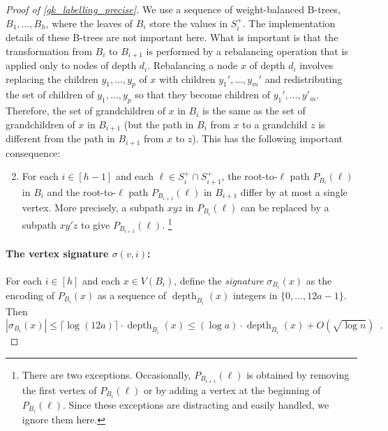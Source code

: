 \documentclass{patmorin}
\renewcommand{\le}{\leqslant}
\newcommand{\defin}[1]{\emph{\textcolor{brightmaroon}{#1}}}
\DeclareMathOperator{\depth}{depth}
\begin{document}
\begin{proof}[Proof of \cref{gk_labelling_precise}]
  We use a sequence of weight-balanced B-trees, $B_1,\ldots,B_h$, where the leaves of $B_i$ store the values in $S^+_i$.  The implementation details of these B-trees are not important here. What is important is that the transformation from $B_i$ to $B_{i+1}$ is performed by a rebalancing operation that is applied only to nodes of depth $d_i$.  Rebalancing a node $x$ of depth $d_i$ involves replacing the children $y_1,\ldots,y_p$ of $x$ with children $y_1',\ldots,y_m'$ and redistributing the set of children of $y_1,\ldots,y_p$ so that they become children of $y_1',\ldots,y'_m$.  Therefore, the set of grandchildren of $x$ in $B_i$ is the same as the set of grandchildren of $x$ in $B_{i+1}$ (but the path in $B_i$ from $x$ to a grandchild $z$ is different from the path in $B_{i+1}$ from $x$ to $z$).  This has the following important consequence:
  \begin{enumerate}[nosep,label=(Q\arabic*)]\setcounter{enumi}{1}
    \item\label{path_splice} For each $i\in[h-1]$ and each $\ell\in S^+_{i}\cap S^+_{i+1}$, the root-to-$\ell$ path $P_{B_{i}}(\ell)$ in $B_{i}$ and the root-to-$\ell$ path $P_{B_{i+1}}(\ell)$ in $B_{i+1}$ differ by at most a single vertex.  More precisely, a subpath $xyz$ in $P_{B_{i}}(\ell)$ can be replaced by a subpath $xy'z$ to give $P_{B_{i+1}}(\ell)$.%
    \footnote{There are two exceptions. Occasionally, $P_{B_{i+1}}(\ell)$ is obtained by removing the first vertex of $P_{B_{i}}(\ell)$ or by adding a vertex at the beginning of $P_{B_{i}}(\ell)$. Since these exceptions are distracting and easily handled, we ignore them here.}
  \end{enumerate}


  \paragraph{\boldmath The vertex signature $\sigma(v,i)$:}

  For each $i\in[h]$ and each $x\in V(B_i)$, define the \defin{signature} \defin{$\sigma_{B_i}(x)$} as the encoding of $P_{B_i}(x)$ as a sequence of $\depth_{B_i}(x)$ integers in $\{0,\ldots,12a-1\}$.  Then 
  \[
    |\sigma_{B_i}(x)| \le \lceil\log (12a)\rceil\cdot\depth_{B_i}(x) 
    \le (\log a)\cdot\depth_{B_i}(x) + O(\sqrt{\log n})   \enspace .
  \]



\end{proof}
\end{document}
